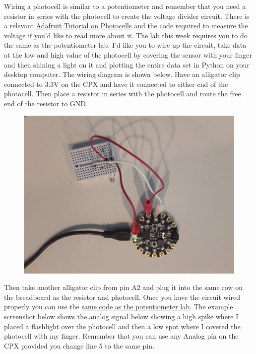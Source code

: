 Wiring a photocell is similar to a potentiometer and remember that you need a resistor in series with the photocell to create the voltage divider circuit. There is a relevant \href{https://learn.adafruit.com/photocells/circuitpython}{Adafruit Tutorial on Photocells} and the code required to measure the voltage if you’d like to read more about it. The lab this week requires you to do the same as the potentiometer lab. I’d like you to wire up the circuit, take data at the low and high value of the photocell by covering the sensor with your finger and then shining a light on it and plotting the entire data set in Python on your desktop computer. The wiring diagram is shown below. Have an alligator clip connected to 3.3V on the CPX and have it connected to either end of the photocell. Then place a resistor in series with the photocell and route the free end of the resistor to GND.
\begin{figure}[H]
  \begin{center}
    \includegraphics[width=\textwidth]{Figures/photocell_circuit.jpeg}
  \end{center}
\end{figure}
Then take another alligator clip from pin A2 and plug it into the same
row on the breadboard as the resistor and photocell. Once you have the
circuit wired properly you can use
the \href{https://github.com/cmontalvo251/Microcontrollers/blob/master/Circuit_Playground/CircuitPython/Analog/analog_simple.py}{same
code as the potentiometer lab}. The example screenshot below shows the
analog signal below showing a high spike where I placed a flashlight
over the photocell and then a low spot where I covered the photocell
with my finger. Remember that you can use any Analog pin on the CPX
provided you change line 5 to the same pin. 

